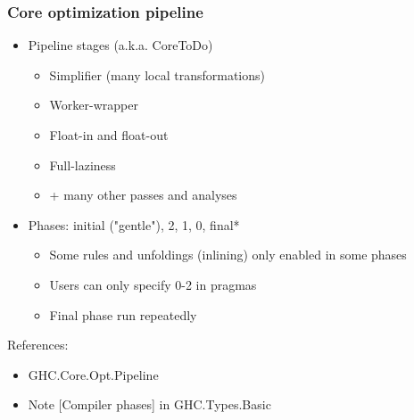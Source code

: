 \documentclass[aspectratio=169]{beamer}
\begin{document}
\begin{frame}
  \frametitle{Core optimization pipeline}
  \begin{itemize}
    \item Pipeline stages (a.k.a. CoreToDo)
      \begin{itemize}
        \item Simplifier (many local transformations)
        \item Worker-wrapper
        \item Float-in and float-out
        \item Full-laziness
        \item + many other passes and analyses
      \end{itemize}
    \item Phases: initial ("gentle"), 2, 1, 0, final*
      \begin{itemize}
        \item Some rules and unfoldings (inlining) only enabled in some phases
        \item Users can only specify 0-2 in pragmas
        \item Final phase run repeatedly
      \end{itemize}
  \end{itemize}

  References:
  \begin{itemize}
    \item GHC.Core.Opt.Pipeline
    \item Note [Compiler phases] in GHC.Types.Basic
  \end{itemize}
\end{frame}
\end{document}
